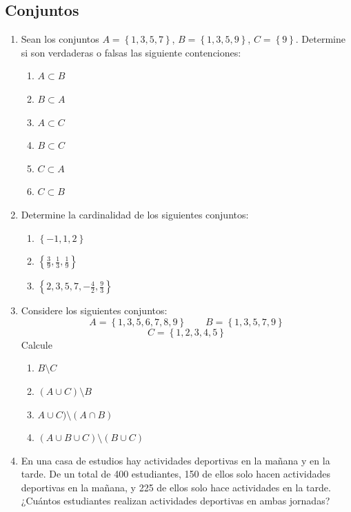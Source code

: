 \documentclass[11pt, twoside]{book}%
\newcommand{\set}[1]{\left\lbrace #1 \right\rbrace}
\begin{document}
\subsection*{Conjuntos}
\begin{enumerate}
    \item Sean los conjuntos \(A=\set{1,3,5,7}\), \(B=\set{1,3,5,9}\), \(C=\set{9}\).
        Determine si son verdaderas o falsas las siguiente contenciones:
        \begin{multicols}{2}
        \begin{enumerate}[label=\alph*)]
            \item \(A\subset B\)
            \item \(B\subset A\)
            \item \(A\subset C\)
            \item \(B\subset C\)
            \item \(C\subset A\)
            \item \(C\subset B\)
        \end{enumerate}
        \end{multicols}
    \item Determine la cardinalidad de los siguientes conjuntos:
        \begin{enumerate}[label=\alph*)]
            \item \(\set{-1, 1,2}\)
            \item \(\set{\frac39,\frac13,\frac19}\)
            \item \(\set{2,3,5,7,-\frac42,\frac93}\)
        \end{enumerate}
    \item Considere los siguientes conjuntos:
        \[A=\set{1,3,5,6,7,8,9}\qquad B=\set{1,3,5,7,9}\]
        \[C=\set{1,2,3,4,5}\]
        Calcule
        \begin{multicols}{2}
        \begin{enumerate}
            \item \(B\setminus C\)
            \item \((A\cup C)\setminus B\)
            \item \(A\cup C)\setminus (A\cap B)\)
            \item \((A\cup B \cup C)\setminus(B\cup C)\)
        \end{enumerate}
        \end{multicols}
    \item En una casa de estudios hay actividades deportivas en la mañana y en la tarde. De un total de 400 estudiantes, 150 de ellos solo hacen actividades deportivas en la mañana, y 225 de ellos solo hace actividades en la tarde. ¿Cuántos estudiantes realizan actividades deportivas en ambas jornadas?

\end{enumerate}
\end{document}
